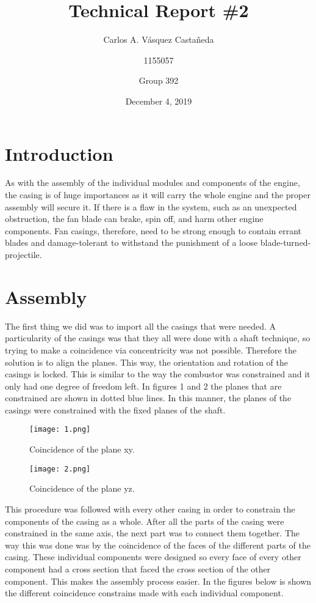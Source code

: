 \documentclass[12pt, letterpaper]{article}
\title{Technical Report \#2}
\author{Carlos A. Vásquez Castañeda \and 1155057 \and Group 392}
\date{December 4, 2019}
\begin{document}
\maketitle
\section*{Introduction}

As with the assembly of the individual modules and components of the engine, the casing is of huge importances as it will carry the whole engine and the proper assembly will secure it. If there is a flaw in the system, such as an unexpected obstruction, the fan blade can brake, spin off, and harm other engine components. Fan casings, therefore, need to be strong enough to contain errant blades and damage-tolerant to withstand the punishment of a loose blade-turned-projectile. \autocite{spinoffnasa}

\section*{Assembly}

The first thing we did was to import all the casings that were needed. A particularity of the casings was that they all were done with a shaft technique, so trying to make a coincidence via concentricity was not possible. Therefore the solution is to align the planes. This way, the orientation and rotation of the casings is locked. This is similar to the way the combustor was constrained and it only had one degree of freedom left. In figures 1 and 2 the planes that are constrained are shown in dotted blue lines. In this manner, the planes of the casings were constrained with the fixed planes of the shaft.

\begin{figure}[H]
	\centering
	\texttt{[image: 1.png]}
	\caption{Coincidence of the plane xy.}
\end{figure}

\begin{figure}[H]
	\centering
	\texttt{[image: 2.png]}
	\caption{Coincidence of the plane yz.}
\end{figure}

This procedure was followed with every other casing in order to constrain the components of the casing as a whole. After all the parts of the casing were constrained in the same axis, the next part was to connect them together. The way this was done was by the coincidence of the faces of the different parts of the casing. These individual components were designed so every face of every other component had a cross section that faced the cross section of the other component. This makes the assembly process easier. In the figures below is shown the different coincidence constrains made with each individual component.
\end{document}
